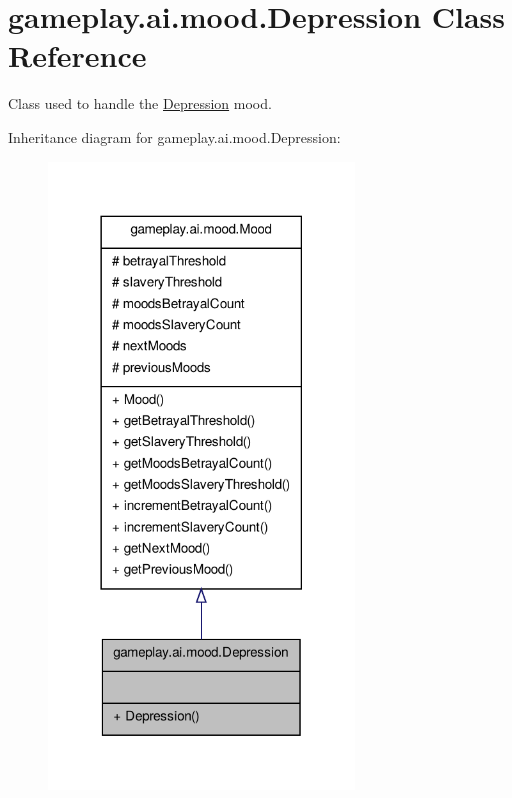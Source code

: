 \hypertarget{classgameplay_1_1ai_1_1mood_1_1_depression}{\section{gameplay.\-ai.\-mood.\-Depression Class Reference}
\label{classgameplay_1_1ai_1_1mood_1_1_depression}
}


Class used to handle the \hyperlink{classgameplay_1_1ai_1_1mood_1_1_depression}{Depression} mood.  




Inheritance diagram for gameplay.\-ai.\-mood.\-Depression\-:\nopagebreak
\begin{figure}[H]
\begin{center}
\leavevmode
\includegraphics[width=230pt]{classgameplay_1_1ai_1_1mood_1_1_depression__inherit__graph}
\end{center}
\end{figure}


